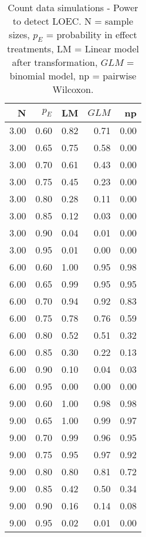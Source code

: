 \begin{table}[H]
\centering
\caption{Count data simulations - Power to detect LOEC. N = sample sizes, 
             $p_E$ = probability in effect treatments, LM = Linear model after transformation, 
             $GLM$ = binomial model, np = pairwise Wilcoxon.} 
\label{tab:pow_loec_p}
{\footnotesize
\begin{tabular}{rrrrr}
  \hline
N & $p_E$ & LM & $GLM$ & np \\ 
  \hline
3.00 & 0.60 & 0.82 & 0.71 & 0.00 \\ 
  3.00 & 0.65 & 0.75 & 0.58 & 0.00 \\ 
  3.00 & 0.70 & 0.61 & 0.43 & 0.00 \\ 
  3.00 & 0.75 & 0.45 & 0.23 & 0.00 \\ 
  3.00 & 0.80 & 0.28 & 0.11 & 0.00 \\ 
  3.00 & 0.85 & 0.12 & 0.03 & 0.00 \\ 
  3.00 & 0.90 & 0.04 & 0.01 & 0.00 \\ 
  3.00 & 0.95 & 0.01 & 0.00 & 0.00 \\ 
  6.00 & 0.60 & 1.00 & 0.95 & 0.98 \\ 
  6.00 & 0.65 & 0.99 & 0.95 & 0.95 \\ 
  6.00 & 0.70 & 0.94 & 0.92 & 0.83 \\ 
  6.00 & 0.75 & 0.78 & 0.76 & 0.59 \\ 
  6.00 & 0.80 & 0.52 & 0.51 & 0.32 \\ 
  6.00 & 0.85 & 0.30 & 0.22 & 0.13 \\ 
  6.00 & 0.90 & 0.10 & 0.04 & 0.03 \\ 
  6.00 & 0.95 & 0.00 & 0.00 & 0.00 \\ 
  9.00 & 0.60 & 1.00 & 0.98 & 0.98 \\ 
  9.00 & 0.65 & 1.00 & 0.99 & 0.97 \\ 
  9.00 & 0.70 & 0.99 & 0.96 & 0.95 \\ 
  9.00 & 0.75 & 0.95 & 0.97 & 0.92 \\ 
  9.00 & 0.80 & 0.80 & 0.81 & 0.72 \\ 
  9.00 & 0.85 & 0.42 & 0.50 & 0.34 \\ 
  9.00 & 0.90 & 0.16 & 0.14 & 0.08 \\ 
  9.00 & 0.95 & 0.02 & 0.01 & 0.00 \\ 
   \hline
\end{tabular}
}
\end{table}
